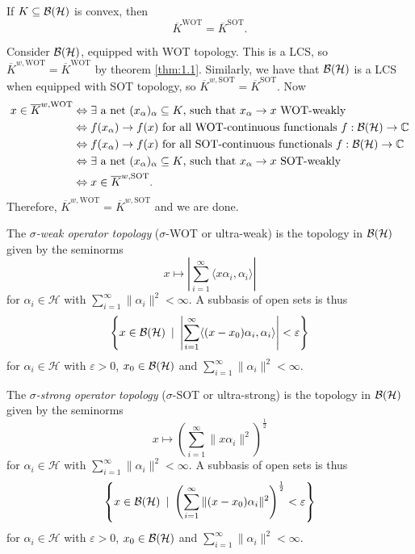 \begin{corollary}
  If $K \subseteq \operatorname{\mathcal{B} (\mathcal{H})}$ is convex, then 
  $$\overline{K}^{\textrm{WOT}} = \overline{K}^{\textrm{SOT}}.$$
\end{corollary}

\begin{myproof}
  Consider $\operatorname{\mathcal{B} (\mathcal{H})}$, equipped with WOT topology. This is a LCS, so $\overline{K}^{w, \textrm{WOT}} = \overline{K}^{\textrm{WOT}}$ 
  by theorem \ref{thm:1.1}. Similarly, we have that $\operatorname{\mathcal{B} (\mathcal{H})}$ is a LCS when equipped with SOT topology, so $\overline{K}^{w, \textrm{SOT}} = \overline{K}^{\textrm{SOT}}$.
  Now 
  \begin{align*}
    x \in \overline{K}^{w, \textrm{WOT}} &\Leftrightarrow \textrm{$\exists$ a net $(x_\alpha)_\alpha \subseteq K$, such that $x_\alpha \to x$ WOT-weakly}\\
    &\Leftrightarrow \textrm{$f(x_\alpha) \to f(x)$ for all WOT-continuous functionals $f: \operatorname{\mathcal{B} (\mathcal{H})} \to \mathbb {C}$}\\
    &\Leftrightarrow \textrm{$f(x_\alpha) \to f(x)$ for all SOT-continuous functionals $f: \operatorname{\mathcal{B} (\mathcal{H})} \to \mathbb {C}$}\\
    &\Leftrightarrow \textrm{$\exists$ a net $(x_\alpha)_\alpha \subseteq K$, such that $x_\alpha \to x$ SOT-weakly}\\
    &\Leftrightarrow x \in \overline{K}^{w, \textrm{SOT}}. 
  \end{align*}
  Therefore, $\overline{K}^{w, \textrm{WOT}} = \overline{K}^{w, \textrm{SOT}}$ and we are done.
\end{myproof}

\begin{definition}
  The \emph{$\sigma$-weak operator topology} ($\sigma$-WOT or ultra-weak) is the topology in $\operatorname{\mathcal{B} (\mathcal{H})}$
  given by the seminorms $$x \mapsto \left| \sum_{i = 1} ^\infty \langle x \alpha_i, \alpha_i \rangle\right| $$
  for $\alpha_i \in \mathcal{H}$ with $\sum_{i = 1} ^\infty \| \alpha_i \|^2 < \infty$.
  A subbasis of open sets is thus 
  $$\left\lbrace x \in \operatorname{\mathcal{B} (\mathcal{H})}\ |\ \left| \sum_{i = 1} ^\infty \langle (x - x_0) \alpha_i, \alpha_i \rangle \right| < \varepsilon \right\rbrace$$
  for $\alpha_i \in \mathcal{H}$ with $\varepsilon > 0$, $x_0 \in \operatorname{\mathcal{B} (\mathcal{H})}$ and $\sum_{i = 1} ^\infty \| \alpha_i\|^2 < \infty$.
\end{definition}

\begin{definition}
  The \emph{$\sigma$-strong operator topology} ($\sigma$-SOT or ultra-strong) is the topology in $\operatorname{\mathcal{B} (\mathcal{H})}$
  given by the seminorms $$x \mapsto \left( \sum_{i = 1} ^\infty \| x \alpha_i \|^2\right)^{\frac{1}{2}}$$
  for $\alpha_i \in \mathcal{H}$ with $\sum_{i = 1} ^\infty \| \alpha_i \|^2 < \infty$.
  A subbasis of open sets is thus 
  $$\left\lbrace x \in \operatorname{\mathcal{B} (\mathcal{H})}\ |\ \left( \sum_{i = 1} ^\infty \| (x - x_0) \alpha_i\|^2 \right)^{\frac{1}{2}} < \varepsilon \right\rbrace$$
  for $\alpha_i \in \mathcal{H}$ with $\varepsilon > 0$, $x_0 \in \operatorname{\mathcal{B} (\mathcal{H})}$ and $\sum_{i = 1} ^\infty \| \alpha_i\|^2 < \infty$.
\end{definition}

